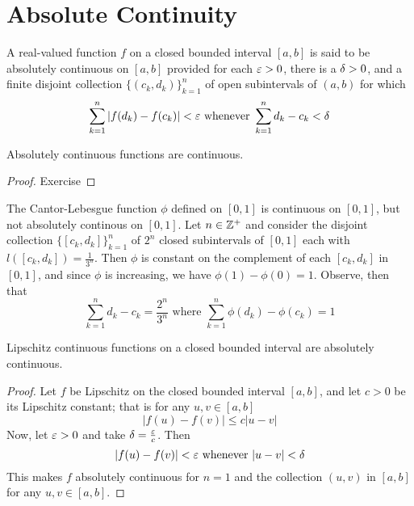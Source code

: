 \section{Absolute Continuity}

\begin{definition}
    A real-valued function $f$ on a closed bounded interval  $[a,b]$ is said to
    be absolutely continuous on $[a,b]$ provided for each $\varepsilon>0$, there is a
    $\delta>0$, and a finite disjoint collection  $\{(c_k,d_k)\}_{k=1}^n$ of open
    subintervals of $(a,b)$ for which
    \begin{equation*}
        \sum_{k=1}^n{|f(d_k)-f(c_k)|}<\varepsilon \text{ whenever }
        \sum_{k=1}^n{d_k-c_k}<\delta
    \end{equation*}
\end{definition}

\begin{lemma}\label{11.3.1}
    Absolutely continuous functions are continuous.
\end{lemma}
\begin{proof}
    Exercise
\end{proof}

\begin{example}\label{example_11.2}
    The Cantor-Lebesgue function $\phi$ defined on $[0,1]$ is continuous on
    $[0,1]$, but not absolutely continous on $[0,1]$. Let $n \in \mathbb{Z}^+$ and
    consider the disjoint collection  $\{[c_k,d_k]\}_{k=1}^n$ of $2^n$ closed
    subintervals of  $[0,1]$ each with $l([c_k,d_k])=\frac{1}{3^n}$. Then $\phi$
    is constant on the complement of each $[c_k,d_k]$ in $[0,1]$, and since
    $\phi$ is increasing, we have $\phi(1)-\phi(0)=1$. Observe, then that
    \begin{equation*}
        \sum_{k=1}^n{d_k-c_k}=\frac{2^n}{3^n} \text{ where }
        \sum_{k=1}^n{\phi(d_k)-\phi(c_k)}=1
    \end{equation*}
\end{example}

\begin{lemma}\label{11.3.2}
    Lipschitz continuous functions on a closed bounded interval are absolutely
    continuous.
\end{lemma}
\begin{proof}
    Let $f$ be Lipschitz on the closed bounded interval  $[a,b]$, and let $c>0$
    be its Lipschitz constant; that is for any  $u,v \in [a,b]$
    \begin{equation*}
        |f(u)-f(v)| \leq c|u-v|
    \end{equation*}
    Now, let $\varepsilon>0$ and take $\delta=\frac{\varepsilon}{c}$. Then
    \begin{equation*}
        |f(u)-f(v)|<\varepsilon \text{ whenever } |u-v|<\delta
    \end{equation*}
    This makes $f$ absolutely continuous for $n=1$ and the collection $(u,v)$ in
    $[a,b]$ for any $u,v \in [a,b]$.
\end{proof}

